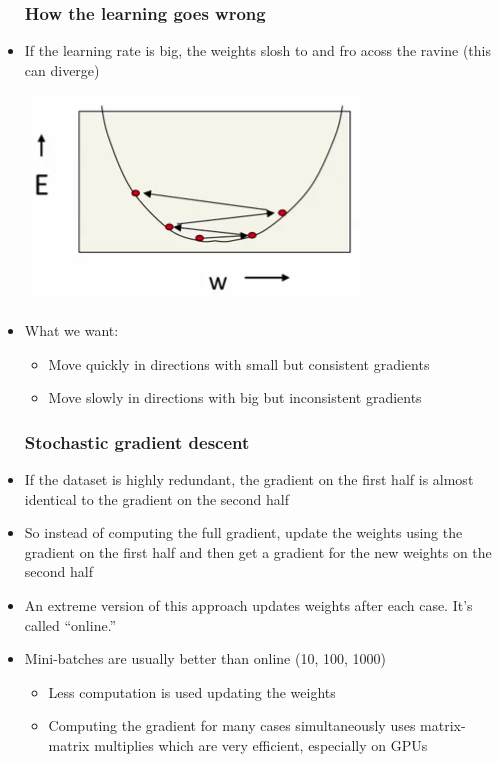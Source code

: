 \begin{itemize}
	\subsubsection{How the learning goes wrong}
	\item If the learning rate is big, the weights slosh to and fro acoss the ravine (this can diverge)
	\begin{center}
		\includegraphics[scale=0.9]{sections/6/div.png}
	\end{center}

	\item What we want:
	\begin{itemize}
		\item Move quickly in directions with small but consistent gradients
		\item Move slowly in directions with big but inconsistent gradients
	\end{itemize}
	
	\subsubsection{Stochastic gradient descent}
	\item If the dataset is highly redundant, the gradient on the first half is almost identical to the gradient on the second half
	\item So instead of computing the full gradient, update the weights using the gradient on the first half and then get a gradient for the new weights on the second half
	\item An extreme version of this approach updates weights after each case. It's called ``online.''
	\item Mini-batches are usually better than online (10, 100, 1000)
	\begin{itemize}
		\item Less computation is used updating the weights
		\item Computing the gradient for many cases simultaneously uses matrix-matrix multiplies which are very efficient, especially on GPUs
	\end{itemize}


\end{itemize}
